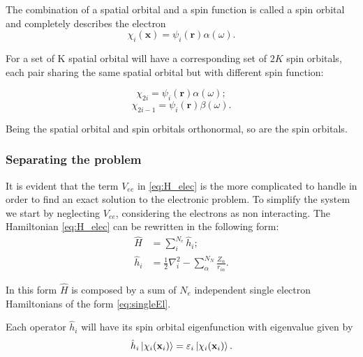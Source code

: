 \documentclass[a4paper,12pt]{article}
\begin{document}
The combination of a spatial orbital and a spin function is called a spin orbital and completely describes the electron
\begin{equation}
	\chi_{i}(\mathbf{x}) = \psi_i(\mathbf{r}) \alpha(\omega).
\end{equation}


For a set of K spatial orbital will have a corresponding set of $2K$ spin orbitals, each pair sharing the same spatial orbital but with different spin function:

\begin{equation}
	\chi_{2i} = \psi_i(\mathbf{r}) \alpha(\omega);
\end{equation}
\begin{equation}
	\chi_{2i-1} = \psi_i(\mathbf{r}) \beta(\omega).
\end{equation}

Being the spatial orbital and spin orbitals orthonormal, so are the spin orbitals.

\subsubsection{Separating the problem}

It is evident that the term $V_{ee}$ in \eqref{eq:H_elec} is the more complicated to handle in order to find an exact solution to the electronic problem.
To simplify the system we start by neglecting $V_{ee}$, considering the electrons as non interacting.
The Hamiltonian \eqref{eq:H_elec} can be rewritten in the following form:
\begin{align}
	\hat{H} & = \sum_{i}^{N_{e}} \hat{h}_{i}; \label{eq:HartreeHamiltonian} 
	\\
	\hat{h}_{i} & = \frac{1}{2} \nabla_{i}^2 - \sum_{\alpha}^{N_{N}} \frac{Z_{\alpha}}{r_{i\alpha}}.  \label{eq:singleElHam}
\end{align}


In this form $\hat{H}$ is composed by a sum of $N_e$ independent single electron Hamiltonians of the form \eqref{eq:singleEl}.

Each operator $\hat{h}_i$ will have its spin orbital eigenfunction with eigenvalue given by
\begin{equation}
	\hat{h}_{i} \ket{\chi_{i}(\mathbf{x}_i) } = \varepsilon_{i} \ket{\chi_{i}(\mathbf{x}_i) }.
\end{equation}
\end{document}
